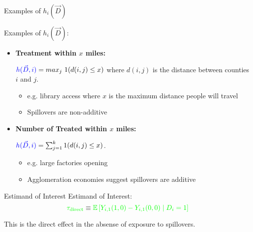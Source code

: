 \documentclass[aspectratio=169]{beamer}
\begin{document}

\begin{frame}{Examples of $h_i(\vec{D})$}
    
    Examples of $h_i(\vec{D})$:
    
    \begin{itemize}
        \item \textbf{Treatment within $x$ miles:}
        
        $\textcolor{blue}{h(\vec{D}, i)} = max_j \ 1(d(i, j) \leq x)$ where $d(i,j)$ is the distance between counties $i$ and $j$. 

        \begin{itemize}
            \item e.g. library access where $x$ is the maximum distance people will travel
            
            \item Spillovers are non-additive
        \end{itemize}
        
        \vspace{2.5mm}
        \item \textbf{Number of Treated within $x$ miles:}
        
        $\textcolor{blue}{h(\vec{D}, i)} = \sum_{j = 1}^k 1(d(i, j) \leq x)$. 

        \begin{itemize}
            \item e.g. large factories opening
            
            \item Agglomeration economies suggest spillovers are additive
        \end{itemize}

    \end{itemize}
\end{frame}




\begin{frame}{Estimand of Interest}
    Estimand of Interest: \[ 
        \textcolor{green}{\tau_{\text{direct}}} \equiv \textcolor{green}{\mathbb{E}\left[ Y_{i,1}(1, 0) - Y_{i,1}(0, 0) \mid D_i = 1\right]}
    \]

    \vspace{10mm}
    This is the direct effect in the absense of exposure to spillovers.
\end{frame}
\end{document}
